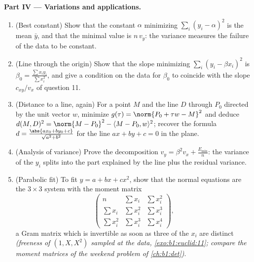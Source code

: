 \begin{problem}
\medskip
\noindent\textbf{Part IV --- Variations and applications.}
\begin{enumerate}[resume]
  \item (Best constant) Show that the constant $\alpha$
        minimizing $\sum_i (y_i - \alpha)^2$ is the mean $\bar
        y$, and that the minimal value is $n\,v_y$: the variance
        measures the failure of the data to be constant.
  \item (Line through the origin) Show that the slope minimizing
        $\sum_i (y_i - \beta x_i)^2$ is $\beta_0 = \frac{\sum
        x_iy_i}{\sum x_i^2}$, and give a condition on the data
        for $\beta_0$ to coincide with the slope
        $c_{xy}/v_x$ of question 11.
  \item (Distance to a line, again) For a point $M$ and the line
        $D$ through $P_0$ directed by the unit vector $w$,
        minimize $g(\tau) = \norm{P_0 + \tau w - M}^2$ and
        deduce $d(M, D)^2 = \norm{M - P_0}^2 - \langle M - P_0,
        w\rangle^2$; recover the formula $d = \frac{\abs{a x_0 +
        b y_0 + c}}{\sqrt{a^2 + b^2}}$ for the line $ax + by + c
        = 0$ in the plane.
  \item (Analysis of variance) Prove the decomposition $v_y =
        \beta^2 v_x + \frac{E_{\min}}n$: the variance of the
        $y_i$ splits into the part explained by the line plus
        the residual variance.
  \item (Parabolic fit) To fit $y = a + bx + cx^2$, show that
        the normal equations are the $3 \times 3$ system with
        the moment matrix
        \[
        \begin{pmatrix}
        n & \sum x_i & \sum x_i^2\\
        \sum x_i & \sum x_i^2 & \sum x_i^3\\
        \sum x_i^2 & \sum x_i^3 & \sum x_i^4
        \end{pmatrix},
        \]
        a Gram matrix which is invertible as soon as three of
        the $x_i$ are distinct \emph{(freeness of $(1, X, X^2)$
        sampled at the data, \cref{exo:b1:euclid:11}; compare
        the moment matrices of the weekend problem of
        \cref{ch:b1:det})}.
\end{enumerate}


\end{problem}
